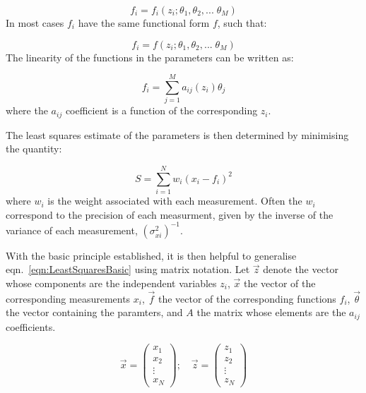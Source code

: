 \begin{equation}
  f_i = f_i\left(z_i; \theta_1, \theta_2, ...\; \theta_M \right)
\end{equation}
In most cases $f_i$ have the same functional form $f$, such that:

\begin{equation}
  f_i = f\left(z_i; \theta_1, \theta_2, ...\; \theta_M \right)
\end{equation}     
The linearity of the functions in the parameters can be written as: 

\begin{equation}
  \label{eqn:FunctionLinearInParameters}
  f_i  = \sum\limits_{j=1}^M a_{ij}(z_i) \theta_j 
\end{equation}
where the $a_{ij}$ coefficient is a function of the corresponding $z_i$. 

The least squares estimate of the parameters is then determined by minimising the quantity:

\begin{equation}
  \label{eqn:LeastSquaresBasic}
  S = \sum\limits_{i=1}^N w_i \left(x_i - f_i \right)^2 
\end{equation}
where $w_i$ is the weight associated with each measurement. Often the $w_i$ correspond to the precision of each measurment, given by the inverse of the variance of each measurement, $\left(\sigma_{xi}^2 \right)^{-1}$.

With the basic principle established, it is then helpful to generalise eqn.~\ref{eqn:LeastSquaresBasic} using matrix notation. Let $\vec{z}$ denote the vector whose components are the independent variables $z_i$, $\vec{x}$ the vector of the corresponding measurements $x_i$, $\vec{f}$ the vector of the corresponding functions $f_i$, $\vec{\theta}$ the vector containing the paramters, and $A$ the matrix whose elements are the $a_{ij}$ coefficients.  

\begin{equation}
  \vec{x} = 
    \begin{pmatrix}
      x_1 \\
      x_2 \\
      \vdots \\
      x_N
    \end{pmatrix}
  \mathrm{;} \quad
  \vec{z} = 
    \begin{pmatrix}
      z_1 \\
      z_2 \\
      \vdots \\
      z_N
    \end{pmatrix}
\end{equation}


